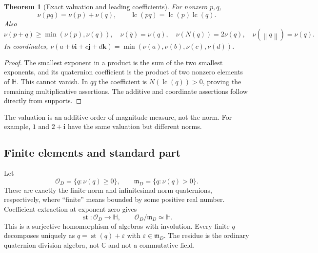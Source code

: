 \documentclass[11pt,letterpaper]{article}
\newtheorem{theorem}{Theorem}[section]
\theoremstyle{definition}
\newcommand{\C}{\mathbb C}
\newcommand{\HH}{\mathbb H}
\newcommand{\OO}{\mathcal O}
\newcommand{\mm}{\mathfrak m}
\newcommand{\ii}{\mathbf i}
\newcommand{\jj}{\mathbf j}
\newcommand{\kk}{\mathbf k}
\newcommand{\val}{\nu}
\newcommand{\norm}[1]{\left\lVert#1\right\rVert}
\DeclareMathOperator{\st}{st}
\begin{document}
\begin{theorem}[Exact valuation and leading coefficients]
\label{thm:val}
For nonzero $p,q$,
\[
 \val(pq)=\val(p)+\val(q),\qquad
 \operatorname{lc}(pq)=\operatorname{lc}(p)\operatorname{lc}(q).
\]
Also
\[
 \val(p+q)\ge\min(\val(p),\val(q)),\quad
 \val(\bar q)=\val(q),\quad
 \val(N(q))=2\val(q),\quad \val(\norm q)=\val(q).
\]
In coordinates, $\val(a+b\ii+c\jj+d\kk)=\min(\val(a),\val(b),\val(c),\val(d))$.
\end{theorem}
\begin{proof}
The smallest exponent in a product is the sum of the two smallest exponents,
and its quaternion coefficient is the product of two nonzero elements of
$\HH$. This cannot vanish. In $q\bar q$ the coefficient is
$N(\operatorname{lc}(q))>0$, proving the remaining multiplicative assertions.
The additive and coordinate assertions follow directly from supports.
\end{proof}
The valuation is an additive order-of-magnitude measure, not the norm. For
example, $1$ and $2+\ii$ have the same valuation but different norms.

\subsection{Finite elements and standard part}
Let
\[
 \OO_D=\{q:\val(q)\ge0\},\qquad \mm_D=\{q:\val(q)>0\}.
\]
These are exactly the finite-norm and infinitesimal-norm quaternions,
respectively, where ``finite'' means bounded by some positive real number.
Coefficient extraction at exponent zero gives
\begin{equation}
 \st:\OO_D\longrightarrow\HH,
 \qquad \OO_D/\mm_D\simeq\HH.
 \label{eq:residue}
\end{equation}
This is a surjective homomorphism of algebras with involution. Every finite
$q$ decomposes uniquely as $q=\st(q)+\varepsilon$ with $\varepsilon\in\mm_D$.
The residue is the ordinary quaternion division algebra, not $\C$ and not a
commutative field.
\end{document}
